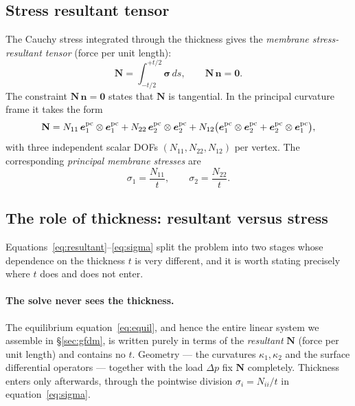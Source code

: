 \documentclass[11pt]{article}
\newcommand{\vv}[1]{\bm{#1}}          %
\newcommand{\nn}{\vv{n}}               %
\newcommand{\Nb}{\mathbf{N}}           %
\newcommand{\tp}{\otimes}              %
\begin{document}
\subsection{Stress resultant tensor}

The Cauchy stress integrated through the thickness gives the \emph{membrane
stress-resultant tensor} (force per unit length):
\begin{equation}
  \Nb = \int_{-t/2}^{+t/2}\bm{\sigma}\,ds,
  \qquad \Nb\,\nn = \vv{0}.
  \label{eq:resultant}
\end{equation}
The constraint $\Nb\,\nn=\vv{0}$ states that $\Nb$ is tangential.  In the
principal curvature frame it takes the form
\begin{equation}
  \Nb
    = N_{11}\,\vv{e}_1^{\rm pc}\tp\vv{e}_1^{\rm pc}
    + N_{22}\,\vv{e}_2^{\rm pc}\tp\vv{e}_2^{\rm pc}
    + N_{12}\bigl(\vv{e}_1^{\rm pc}\tp\vv{e}_2^{\rm pc}
                 +\vv{e}_2^{\rm pc}\tp\vv{e}_1^{\rm pc}\bigr),
  \label{eq:N-decomp}
\end{equation}
with three independent scalar DOFs $(N_{11},N_{22},N_{12})$ per vertex.  The
corresponding \emph{principal membrane stresses} are
\begin{equation}
  \sigma_1 = \frac{N_{11}}{t}, \qquad \sigma_2 = \frac{N_{22}}{t}.
  \label{eq:sigma}
\end{equation}

\subsection{The role of thickness: resultant versus stress}
\label{sec:thickness}

Equations~\eqref{eq:resultant}--\eqref{eq:sigma} split the problem into two
stages whose dependence on the thickness $t$ is very different, and it is worth
stating precisely where $t$ does and does not enter.

\paragraph{The solve never sees the thickness.}
The equilibrium equation~\eqref{eq:equil}, and hence the entire linear system we
assemble in \S\ref{sec:gfdm}, is written purely in terms of the \emph{resultant}
$\Nb$ (force per unit length) and contains no $t$.  Geometry — the curvatures
$\kappa_1,\kappa_2$ and the surface differential operators — together with the
load $\Delta p$ fix $\Nb$ completely.  Thickness enters only afterwards, through
the pointwise division $\sigma_i = N_{ii}/t$ in equation~\eqref{eq:sigma}.
\end{document}

